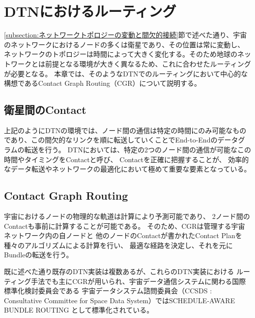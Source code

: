\section{DTNにおけるルーティング}
\label{section:宇宙インターネットにおけるルーティング}
\ref{subsection:ネットワークトポロジーの変動と間欠的接続}節で述べた通り、宇宙のネットワークにおけるノードの多くは衛星であり、その位置は常に変動し、
ネットワークのトポロジーは時間によって大きく変化する。そのため地球のネットワークとは前提となる環境が大きく異なるため、これに合わせたルーティングが必要となる。
本章では、そのようなDTNでのルーティングにおいて中心的な構想であるContact Graph Routing（CGR）\cite{Fraire2021}について説明する。


\subsection{衛星間のContact}
\label{subsection:衛星間のContact}
上記のようにDTNの環境では、ノード間の通信は特定の時間にのみ可能なものであり、この間欠的なリンクを順に転送していくことでEnd-to-Endのデータグラムの転送を行う。
DTNにおいては、特定の2つのノード間の通信が可能なこの時間やタイミングをContactと呼び、
Contactを正確に把握することが、 効率的なデータ転送やネットワークの最適化において極めて重要な要素となっている。


\subsection{Contact Graph Routing}
\label{subsection:Contact Graph Routing}
宇宙におけるノードの物理的な軌道は計算により予測可能であり、
2ノード間のContactも事前に計算することが可能である。 
そのため、CGRは管理する宇宙ネットワーク内の自ノードと
他のノードのContactが書かれたContact Planを種々のアルゴリズムによる計算を行い、
最適な経路を決定し、それを元にBundleの転送を行う。

既に述べた通り既存のDTN実装は複数あるが、これらのDTN実装における
ルーティング手法でも主にCGRが用いられ、宇宙データ通信システムに関わる国際標準化検討委員会である
宇宙データシステム諮問委員会（CCSDS : Consultative Committee 
for Space Data System）ではSCHEDULE-AWARE BUNDLE ROUTING
\cite{schedule_aware_bundle_routing}として標準化されている。

